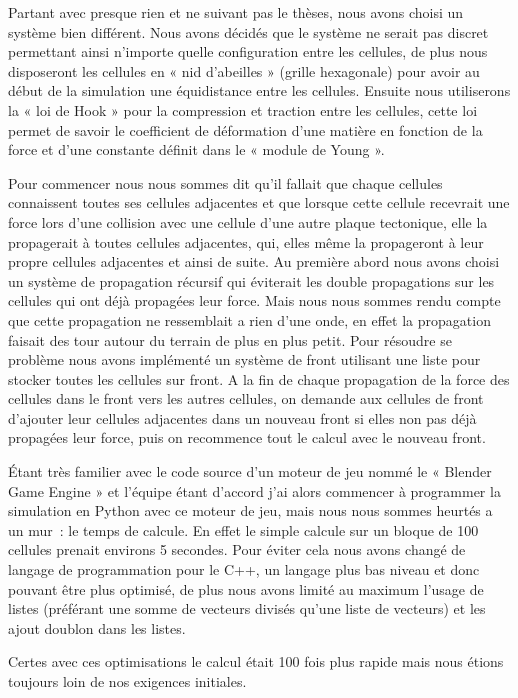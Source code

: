 \documentclass[a4paper,11pt]{article}
\begin{document}
Partant avec presque rien et ne suivant pas le thèses, nous avons choisi un système bien différent.
Nous avons décidés que le système ne serait pas discret permettant ainsi n'importe quelle configuration entre les cellules, de plus nous disposeront les cellules en « nid d'abeilles » (grille hexagonale) pour avoir au début de la simulation une équidistance entre les cellules.
Ensuite nous utiliserons la « loi de Hook » pour la compression et traction entre les cellules, cette loi permet de savoir le coefficient de déformation d'une matière en fonction de la force et d'une constante définit dans le « module de Young ».

Pour commencer nous nous sommes dit qu'il fallait que chaque cellules connaissent toutes ses cellules adjacentes et que lorsque cette cellule recevrait une force lors d'une collision avec une cellule d'une autre plaque tectonique, elle la propagerait à toutes cellules adjacentes, qui, elles même la propageront à leur propre cellules adjacentes et ainsi de suite.
Au première abord nous avons choisi un système de propagation récursif qui éviterait les double propagations sur les cellules qui ont déjà propagées leur force.
Mais nous nous sommes rendu compte que cette propagation ne ressemblait a rien d'une onde, en effet la propagation faisait des tour autour du terrain de plus en plus petit.
Pour résoudre se problème nous avons implémenté un système de front utilisant une liste pour stocker toutes les cellules sur front.
A la fin de chaque propagation de la force des cellules dans le front vers les autres cellules, on demande aux cellules de front d'ajouter leur cellules adjacentes dans un nouveau front si elles non pas déjà propagées leur force, puis on recommence tout le calcul avec le nouveau front.

Étant très familier avec le code source d'un moteur de jeu nommé le « Blender Game Engine » et l'équipe étant d'accord j'ai alors commencer à programmer la simulation en Python avec ce moteur de jeu, mais nous nous sommes heurtés a un mur~: le temps de calcule.
En effet le simple calcule sur un bloque de  100 cellules prenait environs 5 secondes.
Pour éviter cela nous avons changé de langage de programmation pour le C++, un langage plus bas niveau et donc pouvant être plus optimisé, de plus nous avons limité au maximum l'usage de listes (préférant une somme de vecteurs divisés qu'une liste de vecteurs) et les ajout doublon dans les listes.

Certes avec ces optimisations le calcul était 100 fois plus rapide mais nous étions toujours loin de nos exigences initiales.
\end{document}
